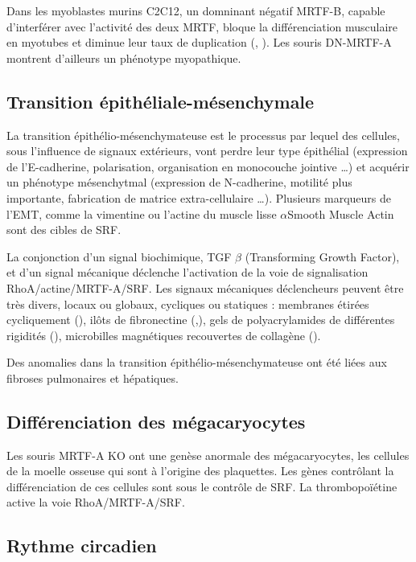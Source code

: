 \documentclass{report}
\begin{document}
Dans les myoblastes murins C2C12, un domninant négatif MRTF-B, capable d'interférer avec l'activité des deux MRTF, bloque la différenciation musculaire en myotubes et diminue leur taux de duplication (\cite{selvaraj_megakaryoblastic_2003}, \cite{cen_megakaryoblastic_2003}). 
Les souris DN-MRTF-A montrent d'ailleurs un phénotype myopathique. 




\subsection{Transition épithéliale-mésenchymale}

La transition épithélio-mésenchymateuse est le processus par lequel des cellules, sous l'influence de signaux extérieurs, vont perdre leur type épithélial (expression de l'E-cadherine, polarisation, organisation en monocouche jointive \dots) et acquérir un phénotype mésenchytmal (expression de N-cadherine, motilité plus importante, fabrication de matrice extra-cellulaire \dots). 
Plusieurs marqueurs de l'EMT, comme la vimentine ou l'actine du muscle lisse $\alpha$Smooth Muscle Actin sont des cibles de SRF. 

La conjonction d'un signal biochimique, TGF $\beta$ (Transforming Growth Factor), et d'un signal mécanique déclenche l'activation de la voie de signalisation RhoA/actine/MRTF-A/SRF. 
Les signaux mécaniques déclencheurs peuvent être très divers, locaux ou globaux, cycliques ou statiques : membranes étirées cycliquement (\cite{maier_tenascin-c_2008}), ilôts de fibronectine  (\cite{gomez_tissue_2010},\cite{connelly_actin_2010}), gels de polyacrylamides de différentes rigidités (\cite{huang_matrix_2012}), microbilles magnétiques recouvertes de collagène (\cite{chan_force-induced_2010}). 

Des anomalies dans la transition épithélio-mésenchymateuse ont été liées aux fibroses pulmonaires et hépatiques.

\subsection{Différenciation des mégacaryocytes}

Les souris MRTF-A KO ont une genèse anormale des mégacaryocytes, les cellules de la moelle osseuse qui sont à l'origine des plaquettes. Les gènes contrôlant la différenciation de ces cellules sont sous le contrôle de SRF. La thrombopoïétine active la voie RhoA/MRTF-A/SRF. 

\subsection{Rythme circadien}
\end{document}
